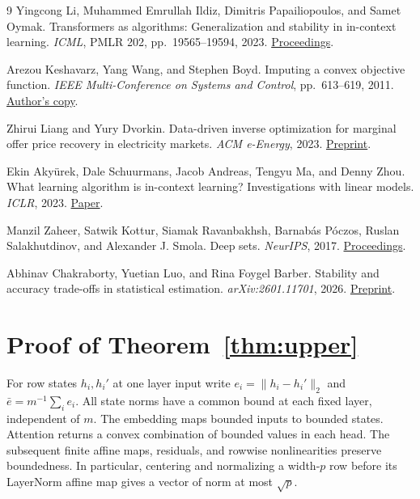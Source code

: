 \documentclass[11pt,letterpaper]{article}
\newcommand{\norm}[1]{\lVert #1\rVert_2}
\begin{document}
\clearpage
\begin{thebibliography}{9}
Yingcong Li, Muhammed Emrullah Ildiz, Dimitris Papailiopoulos, and Samet Oymak.
Transformers as algorithms: Generalization and stability in in-context learning.
\emph{ICML}, PMLR 202, pp.\ 19565--19594, 2023.
\href{https://proceedings.mlr.press/v202/li23l.html}{Proceedings}.

Arezou Keshavarz, Yang Wang, and Stephen Boyd.
Imputing a convex objective function.
\emph{IEEE Multi-Conference on Systems and Control}, pp.\ 613--619, 2011.
\href{https://web.stanford.edu/~boyd/papers/imputed_objective.html}{Author's copy}.

Zhirui Liang and Yury Dvorkin.
Data-driven inverse optimization for marginal offer price recovery in electricity markets.
\emph{ACM e-Energy}, 2023.
\href{https://arxiv.org/abs/2302.05498}{Preprint}.

Ekin Aky\"urek, Dale Schuurmans, Jacob Andreas, Tengyu Ma, and Denny Zhou.
What learning algorithm is in-context learning? Investigations with linear models.
\emph{ICLR}, 2023.
\href{https://arxiv.org/abs/2211.15661}{Paper}.

Manzil Zaheer, Satwik Kottur, Siamak Ravanbakhsh, Barnab\'as P\'oczos,
Ruslan Salakhutdinov, and Alexander J. Smola.
Deep sets. \emph{NeurIPS}, 2017.
\href{https://papers.nips.cc/paper_files/paper/2017/hash/f22e4747da1aa27e363d86d40ff442fe-Abstract.html}{Proceedings}.

Abhinav Chakraborty, Yuetian Luo, and Rina Foygel Barber.
Stability and accuracy trade-offs in statistical estimation.
\emph{arXiv:2601.11701}, 2026.
\href{https://arxiv.org/abs/2601.11701}{Preprint}.
\end{thebibliography}

\clearpage
\appendix
\section{Proof of Theorem~\ref{thm:upper}}
\label{app:encoder}
For row states \(h_i,h_i'\) at one layer input write
\(e_i=\norm{h_i-h_i'}\) and \(\bar e=m^{-1}\sum_i e_i\).
All state norms have a common bound at each fixed layer, independent
of \(m\). The embedding maps bounded inputs to bounded states.
Attention returns a convex combination of bounded values in each
head. The subsequent finite affine maps, residuals, and rowwise
nonlinearities preserve boundedness. In particular, centering and
normalizing a width-\(p\) row before its LayerNorm affine map gives
a vector of norm at most \(\sqrt p\).
\end{document}
